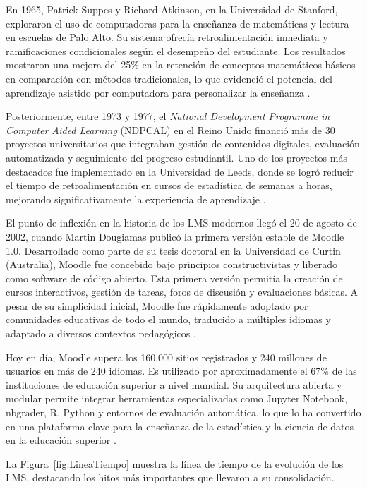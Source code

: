 \documentclass[letter,oneside,12pt,spanish]{report}
\begin{document}
En 1965, Patrick Suppes y Richard Atkinson, en la Universidad de Stanford, exploraron el uso de computadoras para la enseñanza de matemáticas y lectura en escuelas de Palo Alto. Su sistema ofrecía retroalimentación inmediata y ramificaciones condicionales según el desempeño del estudiante. Los resultados mostraron una mejora del 25\% en la retención de conceptos matemáticos básicos en comparación con métodos tradicionales, lo que evidenció el potencial del aprendizaje asistido por computadora para personalizar la enseñanza \parencite{Suppes1966}.

Posteriormente, entre 1973 y 1977, el \textit{National Development Programme in Computer Aided Learning} (NDPCAL) en el Reino Unido financió más de 30 proyectos universitarios que integraban gestión de contenidos digitales, evaluación automatizada y seguimiento del progreso estudiantil. Uno de los proyectos más destacados fue implementado en la Universidad de Leeds, donde se logró reducir el tiempo de retroalimentación en cursos de estadística de semanas a horas, mejorando significativamente la experiencia de aprendizaje \parencite{Hooper1977}.

El punto de inflexión en la historia de los LMS modernos llegó el 20 de agosto de 2002, cuando Martin Dougiamas publicó la primera versión estable de Moodle 1.0. Desarrollado como parte de su tesis doctoral en la Universidad de Curtin (Australia), Moodle fue concebido bajo principios constructivistas y liberado como software de código abierto. Esta primera versión permitía la creación de cursos interactivos, gestión de tareas, foros de discusión y evaluaciones básicas. A pesar de su simplicidad inicial, Moodle fue rápidamente adoptado por comunidades educativas de todo el mundo, traducido a múltiples idiomas y adaptado a diversos contextos pedagógicos \parencite{Moodle2024}.

Hoy en día, Moodle supera los 160.000 sitios registrados y 240 millones de usuarios en más de 240 idiomas. Es utilizado por aproximadamente el 67\% de las instituciones de educación superior a nivel mundial. Su arquitectura abierta y modular permite integrar herramientas especializadas como Jupyter Notebook, nbgrader, R, Python y entornos de evaluación automática, lo que lo ha convertido en una plataforma clave para la enseñanza de la estadística y la ciencia de datos en la educación superior \parencite{Goh2025, Moodle2024}.

La Figura~\ref{fig:LineaTiempo} muestra la línea de tiempo de la evolución de los LMS, destacando los hitos más importantes que llevaron a su consolidación.
\end{document}
